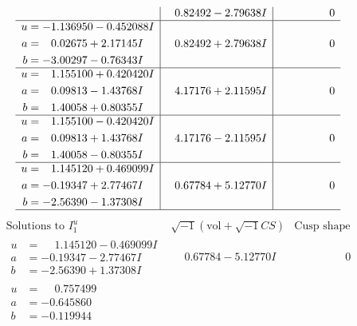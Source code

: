 \documentclass[1p]{elsarticle_modified}
\theoremstyle{definition}
\newcommand{\I}{\sqrt{-1}}
\begin{document}
$$\begin{array}{c|c|c}
 & \phantom{-}0.82492 - 2.79638 I & \phantom{-0.000000 } 0 \\ \hline\begin{aligned}
u &= -1.136950 - 0.452088 I \\
a &= \phantom{-}0.02675 + 2.17145 I \\
b &= -3.00297 - 0.76343 I\end{aligned}
 & \phantom{-}0.82492 + 2.79638 I & \phantom{-0.000000 } 0 \\ \hline\begin{aligned}
u &= \phantom{-}1.155100 + 0.420420 I \\
a &= \phantom{-}0.09813 - 1.43768 I \\
b &= \phantom{-}1.40058 + 0.80355 I\end{aligned}
 & \phantom{-}4.17176 + 2.11595 I & \phantom{-0.000000 } 0 \\ \hline\begin{aligned}
u &= \phantom{-}1.155100 - 0.420420 I \\
a &= \phantom{-}0.09813 + 1.43768 I \\
b &= \phantom{-}1.40058 - 0.80355 I\end{aligned}
 & \phantom{-}4.17176 - 2.11595 I & \phantom{-0.000000 } 0 \\ \hline\begin{aligned}
u &= \phantom{-}1.145120 + 0.469099 I \\
a &= -0.19347 + 2.77467 I \\
b &= -2.56390 - 1.37308 I\end{aligned}
 & \phantom{-}0.67784 + 5.12770 I & \phantom{-0.000000 } 0\\
 \hline 
 \end{array}$$\newpage$$\begin{array}{c|c|c}  
\text{Solutions to }I^u_{1}& \I (\text{vol} + \sqrt{-1}CS) & \text{Cusp shape}\\
 \hline 
\begin{aligned}
u &= \phantom{-}1.145120 - 0.469099 I \\
a &= -0.19347 - 2.77467 I \\
b &= -2.56390 + 1.37308 I\end{aligned}
 & \phantom{-}0.67784 - 5.12770 I & \phantom{-0.000000 } 0 \\ \hline\begin{aligned}
u &= \phantom{-}0.757499\phantom{ +0.000000I} \\
a &= -0.645860\phantom{ +0.000000I} \\
b &= -0.119944\phantom{ +0.000000I}\end{aligned}

\end{array}$$
\end{document}
